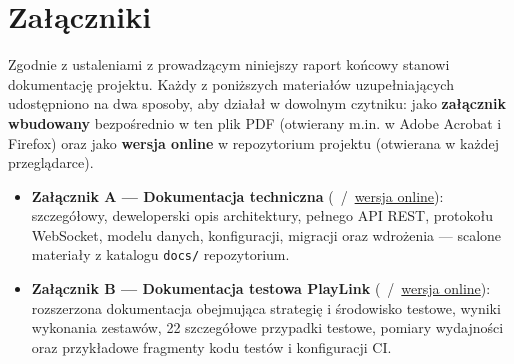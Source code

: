 \section{Załączniki}
\label{sec:zalaczniki}

Zgodnie z ustaleniami z prowadzącym niniejszy raport końcowy stanowi dokumentację
projektu. Każdy z poniższych materiałów uzupełniających udostępniono na dwa sposoby,
aby działał w dowolnym czytniku: jako \textbf{załącznik wbudowany} bezpośrednio w ten
plik PDF (otwierany m.in. w Adobe Acrobat i Firefox) oraz jako \textbf{wersja online}
w repozytorium projektu (otwierana w każdej przeglądarce).

\begin{itemize}
  \item \textbf{Załącznik A — Dokumentacja techniczna}
        (
        \,/\, \href{https://github.com/ioad-modul-sumatywny-26/playlink/blob/main/prezentacje/raport_koncowy/dokumentacja-techniczna.pdf}{wersja online}):
        szczegółowy, deweloperski opis architektury, pełnego API REST, protokołu
        WebSocket, modelu danych, konfiguracji, migracji oraz wdrożenia — scalone
        materiały z katalogu \texttt{docs/} repozytorium.
  \item \textbf{Załącznik B — Dokumentacja testowa PlayLink}
        (
        \,/\, \href{https://github.com/ioad-modul-sumatywny-26/playlink/blob/main/prezentacje/raport_koncowy/dokumentacja-testowa-playlink.pdf}{wersja online}):
        rozszerzona dokumentacja obejmująca strategię i środowisko testowe, wyniki
        wykonania zestawów, 22 szczegółowe przypadki testowe, pomiary wydajności oraz
        przykładowe fragmenty kodu testów i konfiguracji CI.
\end{itemize}
